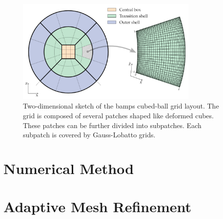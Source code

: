 \begin{figure}[h]
    \centering
    \includegraphics[width=0.8\textwidth]{Figures/Cubed_Ball.png}
    \caption{Two-dimensional sketch of the bamps cubed-ball grid layout. The grid is composed of several patches shaped like deformed cubes. These patches can be further divided into subpatches. Each subpatch is covered by Gauss-Lobatto grids.}
    \label{fig:cubed_ball_grid}
\end{figure}

\section{Numerical Method}
\label{section:Numerical_Method}





\section{Adaptive Mesh Refinement}
\label{section:amr}